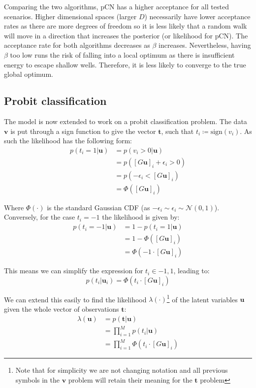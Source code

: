 \documentclass[]{article}
\newcommand{\Ncal}{\mathcal{N}}
\newcommand{\lik}{\lambda}
\newcommand{\tbold}{\boldsymbol{t}}
\newcommand{\ubold}{\boldsymbol{u}}
\newcommand{\vbold}{\boldsymbol{v}}
\begin{document}
Comparing the two algorithms, pCN has a higher acceptance for all tested scenarios. Higher dimensional spaces (larger $D$) necessarily have lower acceptance rates as there are more degrees of freedom so it is less likely that a random walk will move in a direction that increases the posterior (or likelihood for pCN). The acceptance rate for both algorithms decreases as $\beta$ increases. Nevertheless, having $\beta$ too low runs the risk of falling into a local optimum as there is insufficient energy to escape shallow wells. Therefore, it is less likely to converge to the true global optimum.

\subsection{Probit classification}

The model is now extended to work on a probit classification problem. The data $\vbold$ is put through a sign function to give the vector $\tbold$, such that $t_i \coloneqq \textrm{sign}(v_i)$. As such the likelihood has the following form:
%
\begin{align}
	p(t_i = 1 | \ubold) &= p(v_i > 0 | \ubold) \nonumber \\
	&= p([G\ubold]_i + \epsilon_i > 0) \nonumber \\
	&= p(-\epsilon_i < [G\ubold]_i ) \nonumber \\
	&= \Phi([G\ubold]_i)
\end{align}

Where $\Phi(\cdot)$ is the standard Gaussian CDF (as $-\epsilon_i \sim \epsilon_i \sim \Ncal(0,1)$). Conversely, for the case $t_i = -1$ the likelihood is given by:
%
\begin{align}
	p(t_i = -1 | \ubold) &= 1 - p(t_i = 1 | \ubold) \nonumber \\
	&= 1 - \Phi([G\ubold]_i) \nonumber \\
	&= \Phi(-1 \cdot [G\ubold]_i)
\end{align}

This means we can simplify the expression for $t_i \in {-1, 1}$, leading to:
%
\begin{equation}
	p(t_i | \ubold_i) = \Phi(t_i \cdot [G\ubold]_i)
\end{equation}

We can extend this easily to find the likelihood $\lik(\cdot)$\footnote{Note that for simplicity we are not changing notation and all previous symbols in the $\vbold$ problem will retain their meaning for the $\tbold$ problem} of the latent variables $\ubold$ given the whole vector of observations $\tbold$:
%
\begin{align}
	\lik(\ubold) &= p(\tbold | \ubold) \nonumber \\
	&= \prod_{i=1}^{M} p(t_i | \ubold) \nonumber \\
	&= \prod_{i=1}^{M} \Phi(t_i \cdot [G\ubold]_i)
\end{align}
\end{document}

